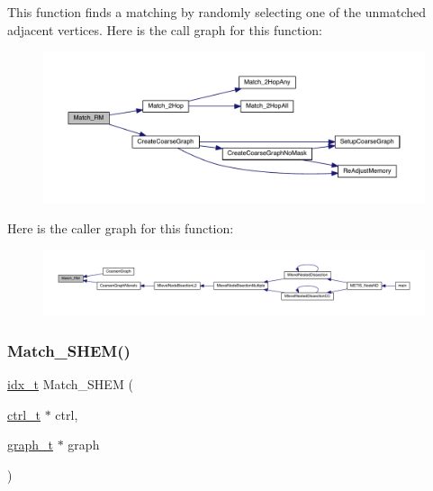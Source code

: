 This function finds a matching by randomly selecting one of the unmatched adjacent vertices. Here is the call graph for this function\+:\nopagebreak
\begin{figure}[H]
\begin{center}
\leavevmode
\includegraphics[width=350pt]{a00182_a892d2ea16d613abc2276ad5fc6999724_cgraph}
\end{center}
\end{figure}
Here is the caller graph for this function\+:\nopagebreak
\begin{figure}[H]
\begin{center}
\leavevmode
\includegraphics[width=350pt]{a00182_a892d2ea16d613abc2276ad5fc6999724_icgraph}
\end{center}
\end{figure}
\mbox{\label{a00182_af3ec72f3170ccdca06d8ad018d86cc58}} 
\subsubsection{\texorpdfstring{Match\+\_\+\+S\+H\+E\+M()}{Match\_SHEM()}}
{\footnotesize\ttfamily \hyperlink{a00876_aaa5262be3e700770163401acb0150f52}{idx\+\_\+t} Match\+\_\+\+S\+H\+EM (\begin{DoxyParamCaption}\item[{\hyperlink{a00742}{ctrl\+\_\+t} $\ast$}]{ctrl,  }\item[{\hyperlink{a00734}{graph\+\_\+t} $\ast$}]{graph }\end{DoxyParamCaption})}

